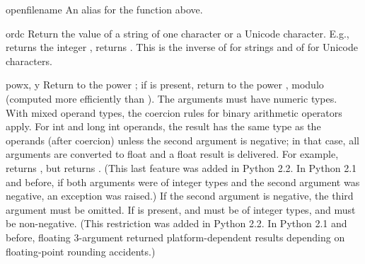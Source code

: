 \begin{funcdesc}{open}{filename}
  An alias for the  function above.
\end{funcdesc}

\begin{funcdesc}{ord}{c}
  Return the \ASCII{} value of a string of one character or a Unicode
  character.  E.g.,  returns the integer ,
   returns .  This is the inverse of
   for strings and of  for Unicode
  characters.
\end{funcdesc}

\begin{funcdesc}{pow}{x, y}
  Return  to the power ; if  is present, return
   to the power , modulo  (computed more
  efficiently than ).  The
  arguments must have numeric types.  With mixed operand types, the
  coercion rules for binary arithmetic operators apply.  For int and
  long int operands, the result has the same type as the operands
  (after coercion) unless the second argument is negative; in that
  case, all arguments are converted to float and a float result is
  delivered.  For example,  returns , but
   returns .  (This last feature was added in
  Python 2.2.  In Python 2.1 and before, if both arguments were of integer
  types and the second argument was negative, an exception was raised.)
  If the second argument is negative, the third argument must be omitted.
  If  is present,  and  must be of integer types,
  and  must be non-negative.  (This restriction was added in
  Python 2.2.  In Python 2.1 and before, floating 3-argument 
  returned platform-dependent results depending on floating-point
  rounding accidents.)
\end{funcdesc}

